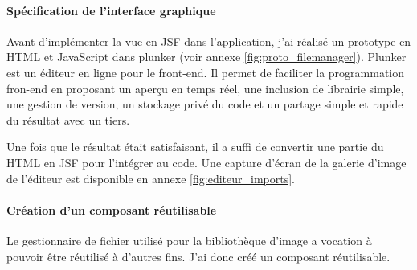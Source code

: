 \paragraph*{Spécification de l'interface graphique\\}
Avant d'implémenter la vue en JSF dans l'application, j'ai réalisé un prototype en HTML et JavaScript dans plunker (voir annexe \ref{fig:proto_filemanager}).
Plunker est un éditeur en ligne pour le front-end. Il permet de faciliter la programmation fron-end en proposant un aperçu en temps réel, une inclusion de librairie simple, une gestion de version, un stockage privé du code et un partage simple et rapide du résultat avec un tiers.

Une fois que le résultat était satisfaisant, il a suffi de convertir une partie du HTML en JSF pour l'intégrer au code.
Une capture d'écran de la galerie d'image de l'éditeur est disponible en annexe \ref{fig:editeur_imports}.

\paragraph*{Création d'un composant réutilisable\\}
Le gestionnaire de fichier utilisé pour la bibliothèque d'image a vocation à pouvoir être réutilisé à d'autres fins.
J'ai donc créé un composant réutilisable.

